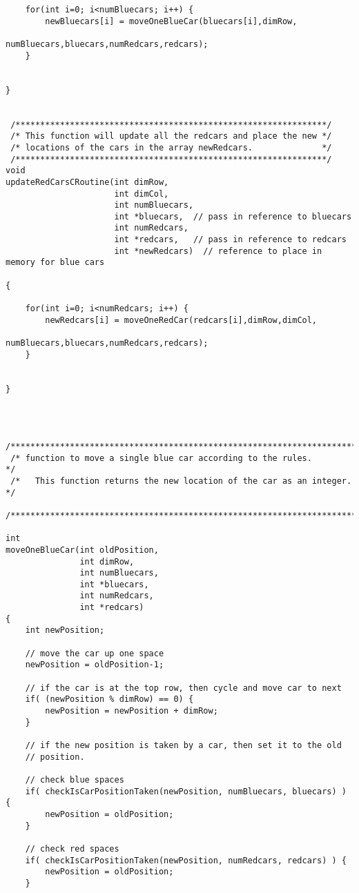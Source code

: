 \documentclass[11pt]{article}
\begin{document}
\begin{verbatim}
    for(int i=0; i<numBluecars; i++) {
        newBluecars[i] = moveOneBlueCar(bluecars[i],dimRow,
                                        numBluecars,bluecars,numRedcars,redcars);
    }


}


 /***************************************************************/
 /* This function will update all the redcars and place the new */
 /* locations of the cars in the array newRedcars.              */
 /***************************************************************/
void
updateRedCarsCRoutine(int dimRow, 
                      int dimCol,
                      int numBluecars,
                      int *bluecars,  // pass in reference to bluecars
                      int numRedcars,
                      int *redcars,   // pass in reference to redcars
                      int *newRedcars)  // reference to place in memory for blue cars

{

    for(int i=0; i<numRedcars; i++) {
        newRedcars[i] = moveOneRedCar(redcars[i],dimRow,dimCol,
                                        numBluecars,bluecars,numRedcars,redcars);
    }


}



 /**********************************************************************/
 /* function to move a single blue car according to the rules.         */
 /*   This function returns the new location of the car as an integer. */
 /**********************************************************************/

int
moveOneBlueCar(int oldPosition,
               int dimRow,
               int numBluecars,
               int *bluecars,
               int numRedcars,
               int *redcars) 
{
    int newPosition;

    // move the car up one space
    newPosition = oldPosition-1;

    // if the car is at the top row, then cycle and move car to next
    if( (newPosition % dimRow) == 0) {
        newPosition = newPosition + dimRow;
    }

    // if the new position is taken by a car, then set it to the old
    // position.

    // check blue spaces
    if( checkIsCarPositionTaken(newPosition, numBluecars, bluecars) ) {
        newPosition = oldPosition;
    }

    // check red spaces
    if( checkIsCarPositionTaken(newPosition, numRedcars, redcars) ) {
        newPosition = oldPosition;
    }


\end{verbatim}
\end{document}
